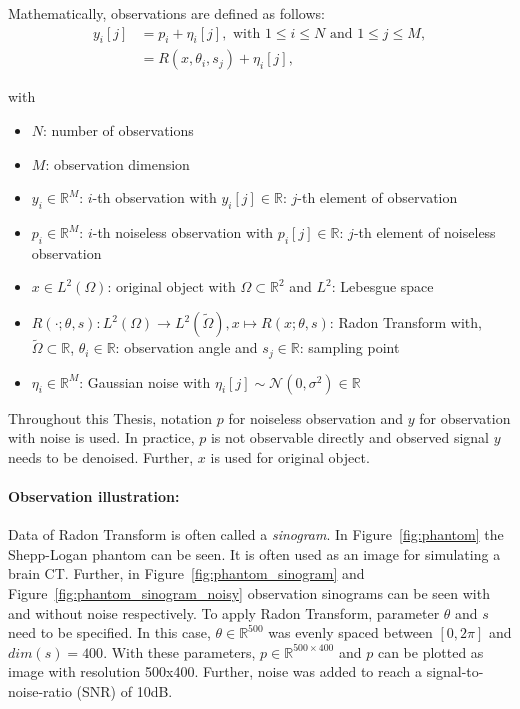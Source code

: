 Mathematically, observations are defined as follows:
\begin{equation}
    \label{eq:2Dreconstruction}
    \begin{aligned}
        y_i[j] &= p_i + \eta_i[j] , \text{ with } 1 \leq i \leq N \text{ and } 1 \leq j \leq M, \\
               &= R(x, \theta_i, s_j) + \eta_i[j],
    \end{aligned}
\end{equation}

with
\begin{itemize}
    \item $N$: number of observations
    \item $M$: observation dimension
    \item $y_i \in \mathbb{R}^M$:  $i$-th observation with $y_i[j] \in \mathbb{R}$: $j$-th element of observation
    \item $p_i \in \mathbb{R}^M$:  $i$-th noiseless observation with $p_i[j] \in \mathbb{R}$: $j$-th element of noiseless observation
    \item $x \in L^2(\Omega)$: original object with $\Omega \subset \mathbb{R}^2 $ and $L^2$: Lebesgue space
    \item $R(\cdot; \theta, s): L^2(\Omega) \to L^2(\tilde{\Omega}) , x \mapsto R(x; \theta,s)$: Radon Transform \cite{radonTransform} with,\\
        $\tilde{\Omega} \subset \mathbb{R}$, $\theta_i \in \mathbb{R}$: observation angle and $s_j \in \mathbb{R}$: sampling point 
    \item $\eta_i \in \mathbb{R}^M$: Gaussian noise with $\eta_i[j] \sim \mathcal{N}(0,\sigma^2) \in \mathbb{R}$
\end{itemize}

\begin{tcolorbox}[colback=red!5!white,colframe=red!75!black]
    Throughout this Thesis, notation $p$ for noiseless observation and $y$ for observation with noise is used.
    In practice, $p$ is not observable directly and observed signal $y$ needs to be denoised.
    Further, $x$ is used for original object.
\end{tcolorbox}

\paragraph{Observation illustration:}

Data of Radon Transform is often called a \textit{sinogram}.
In Figure~\ref{fig:phantom} the Shepp-Logan phantom can be seen.
It is often used as an image for simulating a brain CT.
Further, in Figure~\ref{fig:phantom_sinogram} and Figure~\ref{fig:phantom_sinogram_noisy} 
observation sinograms can be seen with and without noise respectively. 
To apply Radon Transform, parameter $\theta$ and $s$ need to be specified.
In this case, $\theta \in \mathbb{R}^{500}$ was evenly spaced
between $[0, 2 \pi]$ and $dim(s) = 400$. 
With these parameters, $p \in \mathbb{R}^{500 \times 400}$ and $p$ can be plotted as image with resolution 500x400. 
Further, noise was added to reach a signal-to-noise-ratio (SNR) of 10dB.

